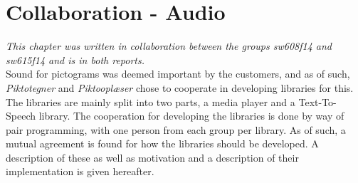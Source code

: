 \chapter{Collaboration - Audio}
\textit{This chapter was written in collaboration between the groups sw608f14 and sw615f14 and is in both reports.}\\

Sound for pictograms was deemed important by the customers, and as of such, \textit{Piktotegner} and \textit{Piktooplæser} chose to cooperate in developing libraries for this.
The libraries are mainly split into two parts, a media player and a Text-To-Speech library.
The cooperation for developing the libraries is done by way of pair programming, with one person from each group per library.
As of such, a mutual agreement is found for how the libraries should be developed.
A description of these as well as motivation and a description of their implementation is given hereafter.





